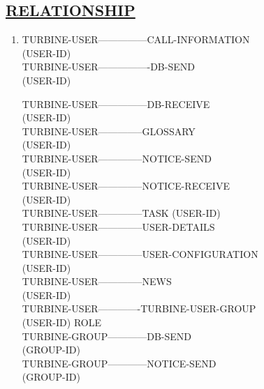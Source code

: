 \documentclass{article}
\begin{document}
\subsection*{\underline{RELATIONSHIP}}
\begin{enumerate}
\item[{}{}]
TURBINE-USER---------------CALL-INFORMATION \\     
         (USER-ID)\\

TURBINE-USER----------------DB-SEND \\
         (USER-ID)

TURBINE-USER---------------DB-RECEIVE \\
          (USER-ID)\\

TURBINE-USER--------------GLOSSARY \\
          (USER-ID)\\

TURBINE-USER--------------NOTICE-SEND \\
         (USER-ID)\\

TURBINE-USER--------------NOTICE-RECEIVE \\
          (USER-ID)\\

TURBINE-USER--------------TASK 
           (USER-ID) \\

TURBINE-USER--------------USER-DETAILS \\
           (USER-ID)\\

TURBINE-USER--------------USER-CONFIGURATION \\
          (USER-ID)\\

TURBINE-USER--------------NEWS \\
         (USER-ID)\\

TURBINE-USER-------------TURBINE-USER-GROUP \\
       (USER-ID)                     ROLE\\

TURBINE-GROUP------------DB-SEND \\
                               (GROUP-ID)\\

TURBINE-GROUP------------NOTICE-SEND \\
       (GROUP-ID) \\


\end{enumerate}
\end{document}
